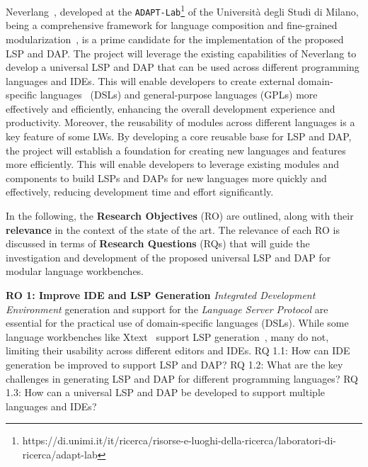 Neverlang~\cite{Cazzola15c, Cazzola14c}, developed at the \texttt{ADAPT-Lab}\footnote{https://di.unimi.it/it/ricerca/risorse-e-luoghi-della-ricerca/laboratori-di-ricerca/adapt-lab} of the Università degli Studi di Milano, being a comprehensive framework for language composition and fine-grained modularization~\cite{Cazzola15f, Cazzola21b}, is a prime candidate for the implementation of the proposed LSP and DAP. The project will leverage the existing capabilities of Neverlang to develop a universal LSP and DAP that can be used across different programming languages and IDEs. This will enable developers to create external domain-specific languages~\cite{Fowler10} (DSLs) and general-purpose languages (GPLs) more effectively and efficiently, enhancing the overall development experience and productivity. Moreover, the reusability of modules across different languages is a key feature of some LWs. By developing a core reusable base for LSP and DAP, the project will establish a foundation for creating new languages and features more efficiently. This will enable developers to leverage existing modules and components to build LSPs and DAPs for new languages more quickly and effectively, reducing development time and effort significantly.

\hfill \break
In the following, the \textbf{Research Objectives} (RO) are outlined, along with their \textbf{relevance} in the context of the state of the art. The relevance of each RO is discussed in terms of \textbf{Research Questions} (RQs) that will guide the investigation and development of the proposed universal LSP and DAP for modular language workbenches.

\hfill \break
\noindent
\textbf{\hypertarget{ro1}{RO 1}: Improve IDE and LSP Generation}
\hfill \break
\textit{Integrated Development Environment} generation and support for the \textit{Language Server Protocol} are essential for the practical use of domain-specific languages (DSLs). While some language workbenches like Xtext~\cite{Bettini13b} support LSP generation~\cite{Barros22}, many do not, limiting their usability across different editors and IDEs.
\hfill \break
\textsf{\hypertarget{rq11}{RQ 1.1}}: How can IDE generation be improved to support LSP and DAP?
\hfill \break
\textsf{\hypertarget{rq12}{RQ 1.2}}: What are the key challenges in generating LSP and DAP for different programming languages?
\hfill \break
\textsf{\hypertarget{rq13}{RQ 1.3}}: How can a universal LSP and DAP be developed to support multiple languages and IDEs?

